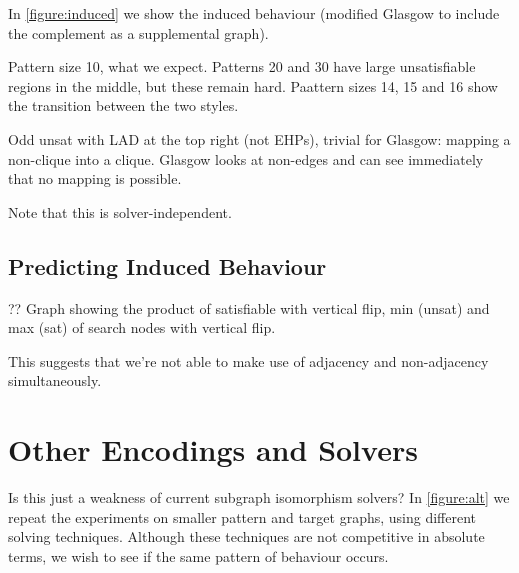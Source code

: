 \documentclass[letterpaper]{article}
\begin{document}
In \cref{figure:induced} we show the induced behaviour (modified Glasgow to include the complement
as a supplemental graph).

Pattern size 10, what we expect. Patterns 20 and 30 have large unsatisfiable regions in the middle,
but these remain hard. Paattern sizes 14, 15 and 16 show the transition between the two styles.

Odd unsat with LAD at the top right (not EHPs), trivial for Glasgow: mapping a non-clique into a
clique. Glasgow looks at non-edges and can see immediately that no mapping is possible.

Note that this is solver-independent.

\begin{figure*}[tb]
    \hskip-1.2cm
    \setlength{\abovecaptionskip}{-3em}
    \caption{Behaviour of algorithms on the induced variant, shown in the style
    of \cref{figure:non-induced}.}\label{figure:induced}
\end{figure*}

\subsection{Predicting Induced Behaviour}

?? Graph showing the product of satisfiable with vertical flip, min (unsat) and max (sat) of search
nodes with vertical flip.

This suggests that we're not able to make use of adjacency and non-adjacency simultaneously.

\section{Other Encodings and Solvers}

\begin{figure*}[tb]
    \hskip-1.2cm
    \setlength{\abovecaptionskip}{-3em}
    \caption{Behaviour of other solvers on the induced variant on smaller graphs, shown in the style of
        \cref{figure:non-induced}. The second row shows the number of search nodes used by the Glasgow
        algorithm, the third row shows the number of decisions made by the Glucose SAT solver, and
    the fourth row shows the number of search nodes used by a clique encoding.}\label{figure:alt}
\end{figure*}

Is this just a weakness of current subgraph isomorphism solvers? In \cref{figure:alt} we repeat the
experiments on smaller pattern and target graphs, using different solving techniques. Although these
techniques are not competitive in absolute terms, we wish to see if the same pattern of behaviour
occurs.
\end{document}

